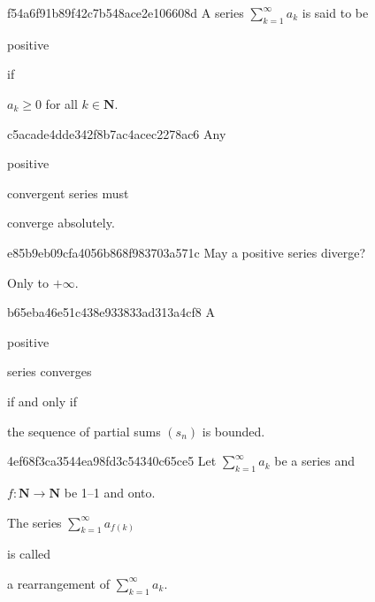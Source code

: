 \begin{note}{f54a6f91b89f42c7b548ace2e106608d}
    A series \({ \sum_{k=1}^{\infty} a_k }\) is said to be \begin{icloze}{2}positive\end{icloze} if \begin{icloze}{1}\({ a_k \geq 0 }\) for all \({ k \in \mathbf{N} }\).\end{icloze}
\end{note}

\begin{note}{c5acade4dde342f8b7ac4acec2278ac6}
    Any \begin{icloze}{2}positive\end{icloze} convergent series must \begin{icloze}{1}converge absolutely.\end{icloze}
\end{note}

\begin{note}{e85b9eb09cfa4056b868f983703a571c}
    May a positive series diverge?

    \begin{cloze}{1}
        Only to \({ +\infty }\).
    \end{cloze}
\end{note}

\begin{note}{b65eba46e51c438e933833ad313a4cf8}
    A \begin{icloze}{2}positive\end{icloze} series converges \begin{icloze}{3}if and only if\end{icloze} \begin{icloze}{1}the sequence of partial sums \({ (s_n) }\) is bounded.\end{icloze}
\end{note}

\begin{note}{4ef68f3ca3544ea98fd3c54340c65ce5}
    Let \({ \sum_{k=1}^{\infty} a_k }\) be a series and \begin{icloze}{3}\({ f : \mathbf{N} \to \mathbf{N} }\) be 1--1 and onto.\end{icloze}
    \begin{icloze}{2}The series \({ \sum_{k=1}^{\infty} a_{f(k)} }\)\end{icloze} is called \begin{icloze}{1}a rearrangement of \({ \sum_{k=1}^{\infty} a_k }\).\end{icloze}
\end{note}

